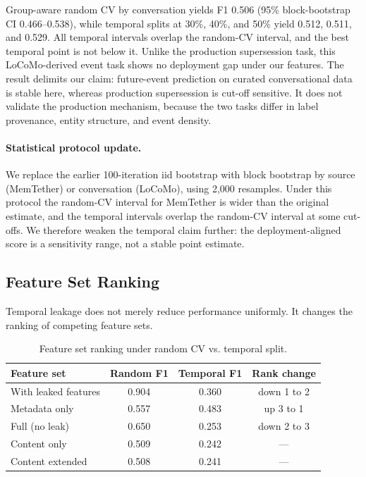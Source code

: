 \documentclass[sigconf,nonacm]{acmart}
\begin{document}
Group-aware random CV by conversation yields F1 0.506 (95\% block-bootstrap CI 0.466--0.538), while temporal splits at 30\%, 40\%, and 50\% yield 0.512, 0.511, and 0.529. All temporal intervals overlap the random-CV interval, and the best temporal point is not below it. Unlike the production supersession task, this LoCoMo-derived event task shows no deployment gap under our features. The result delimits our claim: future-event prediction on curated conversational data is stable here, whereas production supersession is cut-off sensitive. It does not validate the production mechanism, because the two tasks differ in label provenance, entity structure, and event density.

\paragraph{Statistical protocol update.}
We replace the earlier 100-iteration iid bootstrap with block bootstrap by source (MemTether) or conversation (LoCoMo), using 2,000 resamples. Under this protocol the random-CV interval for MemTether is wider than the original estimate, and the temporal intervals overlap the random-CV interval at some cut-offs. We therefore weaken the temporal claim further: the deployment-aligned score is a sensitivity range, not a stable point estimate.

\subsection{Feature Set Ranking}
\label{sec:ranking}

Temporal leakage does not merely reduce performance uniformly. It changes the ranking of competing feature sets.

\begin{table}[h]
\centering
\caption{Feature set ranking under random CV vs. temporal split.}
\label{tab:ranking}
\begin{tabular}{lccc}
\toprule
Feature set & Random F1 & Temporal F1 & Rank change \\
\midrule
With leaked features & 0.904 & 0.360 & down 1 to 2 \\
Metadata only & 0.557 & 0.483 & up 3 to 1 \\
Full (no leak) & 0.650 & 0.253 & down 2 to 3 \\
Content only & 0.509 & 0.242 & --- \\
Content extended & 0.508 & 0.241 & --- \\
\bottomrule
\end{tabular}
\end{table}
\end{document}
